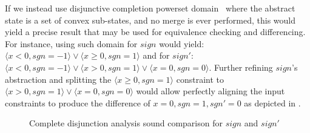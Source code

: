 If we instead use disjunctive completion powerset domain~\cite{TODO} where the abstract state is a set of convex sub-states, and no merge is ever performed, this would yield a precise result that may be used for equivalence checking and differencing.  For instance, using such domain for $sign$ would yield: $\langle x < 0, sgn = -1 \rangle \vee \langle x \geq 0, sgn = 1 \rangle$ and for $sign'$: $\langle x < 0, sgn = -1 \rangle \vee \langle x > 0, sgn = 1 \rangle \vee \langle x = 0, sgn = 0 \rangle$. Further refining $sign$'s abstraction and splitting the $\langle x \geq 0, sgn = 1 \rangle$ constraint to $\langle x > 0, sgn = 1 \rangle \vee \langle x = 0, sgn = 0 \rangle$ would allow perfectly aligning the input constraints to produce the difference of $x=0,sgn=1,sgn'=0$ as depicted in .
\begin{figure}
\caption{Complete disjunction analysis sound comparison for $sign$ and $sign'$}
\end{figure} 

